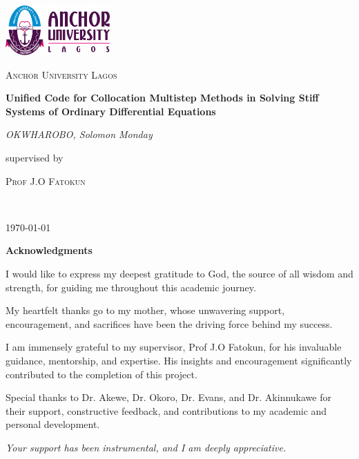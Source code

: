\documentclass[a4paper, twoside]{report}
\begin{document}
\begin{titlepage}
   \centering
   \vspace*{1cm}
   \includegraphics[width=0.3\textwidth]{aul_logo.png}\par
   \vspace{1.5cm}
   {\scshape\LARGE Anchor University Lagos \par}
   \vspace{1cm}
   \vspace{1.5cm}
   {\huge\bfseries Unified Code for Collocation Multistep Methods in Solving Stiff Systems of Ordinary Differential Equations\par}
   \vspace{2cm}
   {\Large\itshape OKWHAROBO, Solomon Monday\par}
   \vfill
   supervised by\par
   \textsc{Prof J.O Fatokun}
  
   
    \\
   

   \vfill

   {\large \today\par}
\end{titlepage}


\begin{titlepage}
  \centering
  \vspace*{2cm}
  \LARGE\textbf{Acknowledgments}
  
  \vspace{1cm}
  \large
  I would like to express my deepest gratitude to God, the source of all wisdom and strength, for guiding me throughout this academic journey.

  \vspace{0.5cm}
  My heartfelt thanks go to my mother, whose unwavering support, encouragement, and sacrifices have been the driving force behind my success.

  \vspace{0.5cm}
  I am immensely grateful to my supervisor, Prof J.O Fatokun, for his invaluable guidance, mentorship, and expertise. His insights and encouragement significantly contributed to the completion of this project.

  \vspace{0.5cm}
  Special thanks to Dr. Akewe, Dr. Okoro, Dr. Evans, and Dr. Akinnukawe for their support, constructive feedback, and contributions to my academic and personal development.

  \vspace{2cm}
  \textit{Your support has been instrumental, and I am deeply appreciative.}
\end{titlepage}
\end{document}
